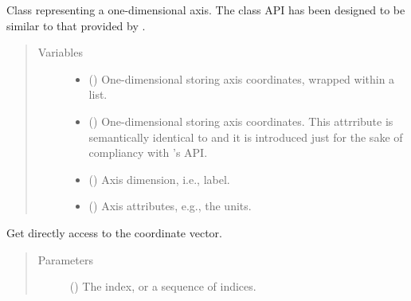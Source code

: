\documentclass[letterpaper,10pt,english]{sphinxmanual}
\begin{document}
\begin{fulllineitems}
\label{\detokenize{api:grids.axis.Axis}}
Class representing a one-dimensional axis. The class API has been designed to be similar to
that provided by .
\begin{quote}\begin{description}
\item[{Variables}] \leavevmode\begin{itemize}
\item {} 
 () \textendash{} One-dimensional  storing axis coordinates, wrapped
within a list.

\item {} 
 () \textendash{} One-dimensional  storing axis coordinates.
This attrribute is semantically identical to  and it is
introduced just for the sake of compliancy with ’s API.

\item {} 
 () \textendash{} Axis dimension, i.e., label.

\item {} 
 () \textendash{} Axis attributes, e.g., the units.

\end{itemize}

\end{description}\end{quote}

\begin{fulllineitems}
\label{\detokenize{api:grids.axis.Axis.__getitem__}}
Get directly access to the coordinate vector.
\begin{quote}\begin{description}
\item[{Parameters}] \leavevmode
{} () \textendash{} The index, or a sequence of indices.


\end{description}
\end{quote}
\end{fulllineitems}
\end{fulllineitems}
\end{document}
